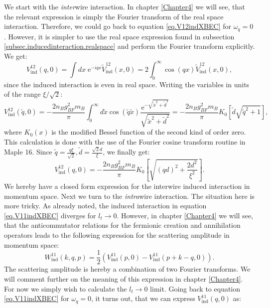 We start with the \textit{inter}wire interaction. In chapter \ref{Chapter4} we will see, that the relevant expression is simply the Fourier transform of the real space interaction. Therefore, we could go back to equation \eqref{eq.V12indXBEC} for $\omega_q = 0$. However, it is simpler to use the real space expression found in subsection \ref{subsec.inducedinteraction.realspace} and perform the Fourier transform explicitly. We get:
\begin{equation}
V_{\text{ind}}^{12}(q,0) = \int dx \; \text{e}^{-iqx}\tilde{V}_{\text{ind}}^{12}(x,0) = 2\int_0^\infty \cos(qx)\tilde{V}_{\text{ind}}^{12}(x,0), \nonumber
\end{equation}
since the induced interaction is even in real space. Writing the variables in units of the range $\xi/\sqrt{2}$:
\begin{equation}
V_{\text{ind}}^{12}(\tilde{q},0) = -\frac{2n_Bg^2_{BF}m_B}{\pi}\int_0^\infty d\tilde{x} \cos(\tilde{q}\tilde{x})\frac{ \text{e}^{ -\sqrt{\tilde{x}^2+\tilde{d}^2} } }{\sqrt{\tilde{x}^2+\tilde{d}^2}} = -\frac{2n_Bg^2_{BF}m_B}{\pi}K_0\left[\tilde{d}\sqrt{\tilde{q}^2+1}\right], \nonumber
\end{equation}
where $K_0(x)$ is the modified Bessel function of the second kind of order zero. This calculation is done with the use of the Fourier cosine transform routine in Maple 16. Since $\tilde{q} = \frac{q\xi}{\sqrt{2}}, \tilde{d} = \frac{\sqrt{2}d}{\xi}$, we finally get:
 \begin{equation}
V_{\text{ind}}^{12}(q,0) = -\frac{2n_Bg^2_{BF}m_B}{\pi}K_0\left[\sqrt{(qd)^2+\frac{2d^2}{\xi^2}}\right]. 
\label{eq.V12indq.zerofrequency}
\end{equation}
We hereby have a closed form expression for the interwire induced interaction in momentum space. Next we turn to the \textit{intra}wire interaction. The situation here is more tricky. As already noted, the induced interaction in equation \eqref{eq.V11indXBEC} diverges for $l_t \to 0$. However, in chapter \ref{Chapter4} we will see, that the anticommutator relations for the fermionic creation and annihilation operators leads to the following expression for the scattering amplitude in momentum space:
\begin{equation}
W^{11}_{\text{ind}}(k, q, p) = \frac{1}{2}\left(V^{11}_{\text{ind}}\left( p, 0 \right) - V^{11}_\text{ind}\left( p + k - q, 0 \right) \right). 
\label{eq.Wkqp.scattering.amplitude}
\end{equation}
The scattering amplitude is hereby a combination of two Fourier transforms. We will comment further on the meaning of this expression in chapter \ref{Chapter4}. For now we simply wish to calculate the $l_t \to 0$ limit. Going back to equation \eqref{eq.V11indXBEC} for $\omega_q = 0$, it turns out, that we can express $V^{11}_\text{ind}\left( q, 0 \right)$ as:
